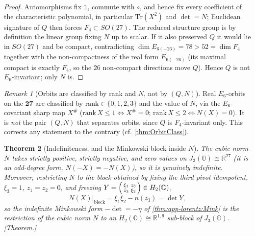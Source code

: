 \documentclass[11pt]{article}
\theoremstyle{plain}
\newtheorem{theorem}{Theorem}[section]
\theoremstyle{definition}
\theoremstyle{remark}
\newtheorem{remark}[theorem]{Remark}
\begin{document}
\begin{proof}
Automorphisms fix $\mathbb{1}$, commute with $\circ$, and hence fix every
coefficient of the characteristic polynomial, in particular $\mathrm{Tr}(X^{2})$ and
$\det=N$; Euclidean signature of $Q$ then forces $F_{4}\subset SO(27)$. The reduced
structure group is by definition the linear group fixing $N$ up to scalar. If it also
preserved $Q$ it would lie in $SO(27)$ and be compact, contradicting
$\dim E_{6(-26)}=78>52=\dim F_{4}$ together with the non-compactness of the real form
$E_{6(-26)}$ (its maximal compact is exactly $F_{4}$, so the $26$ non-compact
directions move $Q$). Hence $Q$ is not $E_{6}$-invariant; only $N$ is.
\end{proof}

\begin{remark}[Orbits are classified by rank and \texorpdfstring{$N$}{N}, not by \texorpdfstring{$(Q,N)$}{(Q,N)}]
\label{rmk:app-lorentz:orbits}
Real $E_{6}$-orbits on the $\mathbf{27}$ are classified by
$\mathrm{rank}\in\{0,1,2,3\}$ and the value of $N$, via the $E_{6}$-covariant
sharp map $X^{\#}$ ($\mathrm{rank}\,X\le1\Leftrightarrow X^{\#}=0$;
$\mathrm{rank}\,X\le2\Leftrightarrow N(X)=0$). It is \emph{not} the pair $(Q,N)$
that separates orbits, since $Q$ is $F_{4}$-invariant only. This corrects any
statement to the contrary (cf. \autoref{thm:OrbitClass}).
\end{remark}

\begin{theorem}[Indefiniteness, and the Minkowski block inside \texorpdfstring{$N$}{N}]
\label{thm:app-lorentz:indef}
The cubic norm $N$ takes strictly positive, strictly negative, and zero values on
$J_{3}(\mathbb{O})\cong\mathbb{R}^{27}$ (it is an odd-degree form,
$N(-X)=-N(X)$), so it is genuinely indefinite. Moreover, restricting $N$ to the
block obtained by fixing the third pivot idempotent, $\xi_{3}=1$, $z_{1}=z_{2}=0$,
and freezing $Y=\begin{psmallmatrix}\xi_{1}&z_{3}\\ \bar z_{3}&\xi_{2}\end{psmallmatrix}\in H_{2}(\mathbb{O})$,
\begin{equation}
\label{eq:app-lorentz:block}
N(X)\big|_{\mathrm{block}}=\xi_{1}\xi_{2}-n(z_{3})=\det Y,
\end{equation}
so the indefinite Minkowski form $-\det=-\eta$ of \autoref{thm:app-lorentz:Mink} is
the restriction of the cubic norm $N$ to an $H_{2}(\mathbb{O})\cong\mathbb{R}^{1,9}$
sub-block of $J_{3}(\mathbb{O})$. \emph{[Theorem.]}
\end{theorem}
\end{document}

